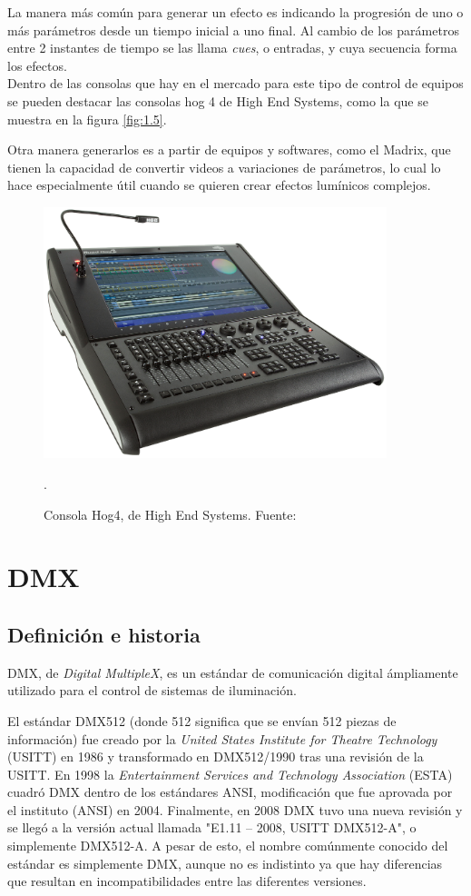 La manera más común para generar un efecto es indicando la progresión de uno o más parámetros desde un tiempo inicial a uno final. Al cambio de los parámetros entre 2 instantes de tiempo se las llama \textit{cues}, o entradas, y cuya secuencia forma los efectos. \\
Dentro de las consolas que hay en el mercado para este tipo de control de equipos se pueden destacar las consolas hog 4 de High End Systems, como la que se muestra en la figura \ref{fig:1.5}.

Otra manera generarlos es a partir de equipos y softwares, como el Madrix, que tienen la capacidad de convertir videos a variaciones de parámetros, lo cual lo hace especialmente útil cuando se quieren crear efectos lumínicos complejos.


\begin{figure}[!ht]
	\centering
	\includegraphics[width=10cm,scale=1]{resources/1_5-consolaHOG.png}
	\caption{Consola Hog4, de High End Systems. Fuente: \cite{fig1_5}}.
	\label{fig:\thefigure}
\end{figure}

\newpage
\section{DMX} \label{sec:\thesection}
\subsection{Definición e historia}
DMX, de \textit{Digital MultipleX}, es un estándar de comunicación digital ámpliamente utilizado para el control de sistemas de iluminación. 

El estándar DMX512 (donde 512 significa que se envían 512 piezas de información) fue creado por la \textit{United States Institute for Theatre Technology} (USITT) en 1986 y transformado en DMX512/1990 tras una revisión de la USITT. En 1998 la \textit{Entertainment Services and Technology Association} (ESTA) cuadró DMX dentro de los estándares ANSI, modificación que fue aprovada por el instituto (ANSI) en 2004. Finalmente, en 2008 DMX tuvo una nueva revisión y se llegó a la versión actual llamada "E1.11 – 2008, USITT DMX512-A", o simplemente DMX512-A. A pesar de esto, el nombre comúnmente conocido del estándar es simplemente DMX, aunque no es indistinto ya que hay diferencias que resultan en incompatibilidades entre las diferentes versiones.



